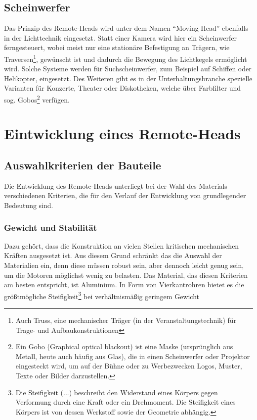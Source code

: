\documentclass[a4paper, 12pt, bibtotocnumbered, liststotocnumbered]{scrartcl}
\begin{document}
	\subsection{Scheinwerfer}
	Das Prinzip des Remote-Heads wird unter dem Namen “Moving Head” ebenfalls in der Lichttechnik eingesetzt. Statt einer Kamera wird hier ein Scheinwerfer ferngesteuert, wobei meist nur eine stationäre Befestigung an Trägern, wie Traversen\footnote{Auch Truss, eine mechanischer Träger (in der Veranstaltungstechnik) für Trage- und Aufbaukonstruktionen}, gewünscht ist und dadurch die Bewegung des Lichtkegels ermöglicht wird. Solche Systeme werden für Suchscheinwerfer, zum Beispiel auf Schiffen oder Helikopter, eingesetzt. Des Weiteren gibt es in der Unterhaltungsbranche spezielle Varianten für Konzerte, Theater oder Diskotheken, welche über Farbfilter und sog. Gobos\footnote{Ein Gobo (Graphical optical blackout) ist eine Maske (ursprünglich aus Metall, heute auch häufig aus Glas), die in einen Scheinwerfer oder Projektor eingesteckt wird, um auf der Bühne oder zu Werbezwecken Logos, Muster, Texte oder Bilder darzustellen.} verfügen.

	\section{Eintwicklung eines Remote-Heads}
	\subsection{Auswahlkriterien der Bauteile}
	Die Entwicklung des Remote-Heads unterliegt bei der Wahl des Materials verschiedenen Kriterien, die für den Verlauf der Entwicklung von grundlegender Bedeutung sind.

	\subsubsection{Gewicht und Stabilität}
	Dazu gehört, dass die Konstruktion an vielen Stellen kritischen mechanischen Kräften ausgesetzt ist. Aus diesem Grund schränkt das die Auswahl der Materialien ein, denn diese müssen robust sein, aber dennoch leicht genug sein, um die Motoren möglichst wenig zu belasten. Das Material, das diesen Kriterien am besten entspricht, ist Aluminium. In Form von Vierkantrohren bietet es die größtmögliche Steifigkeit\footnote{Die Steifigkeit (...) beschreibt den Widerstand eines Körpers gegen Verformung durch eine Kraft oder ein Drehmoment. Die Steifigkeit eines Körpers ist von dessen Werkstoff sowie der Geometrie abhängig.} bei verhältnismäßig geringem Gewicht
\end{document}
